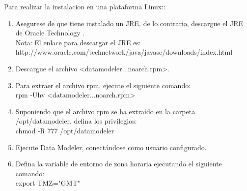\documentclass[12pt,letterpaper]{article}
\begin{document}
	
Para realizar la instalacion en una plataforma Linux::
\begin{enumerate}[1.]
    \item Asegurese de que tiene instalado un JRE, de lo contrario, descargue el JRE de Oracle Technology .  \\
    Nota: El enlace para descargar el JRE es: http://www.oracle.com/technetwork/java/javase/downloads/index.html
    
   \item Descargue el archivo <datamodeler...noarch.rpm>.
   
   \item Para extraer el archivo rpm, ejecute el siguiente comando:\\
   rpm -Uhv <datamodeler...noarch.rpm>
   
   \item Suponiendo que el archivo rpm se ha extraído en la carpeta /opt/datamodeler, defina los privilegios:\\
   chmod -R 777 /opt/datamodeler
   
    \item Ejecute Data Modeler, conectándose como usuario configurado.
    
    \item Defina la variable de entorno de zona horaria ejecutando el siguiente comando:\\
    export TMZ="GMT"
   
		\end{enumerate}
		
		
		
\end{document}
